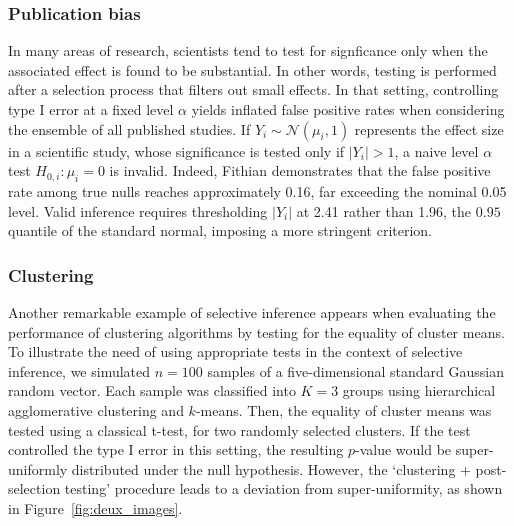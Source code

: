 \documentclass[a4paper,11pt]{article}
\theoremstyle{plain}
\newcommand{\1}{\mathbf{1}}
\begin{document}


\subsubsection{Publication bias}


In many areas of research, scientists tend to test for signficance only when the associated effect is found to be substantial. In other words, testing is performed after a selection process that filters out small effects. In that setting, controlling type I error at a fixed level $\alpha$ yields inflated false positive rates when considering the ensemble of all published studies. 
If $Y_i \sim \mathcal{N}(\mu_i,1)$ represents the effect size in a scientific study, whose significance is tested only if  $|Y_i| > 1$, a naive level $\alpha$ test $H_{0,i}: \mu_i = 0$ is invalid. Indeed, Fithian \cite{fithian} demonstrates that the false positive rate among true nulls reaches approximately 0.16, far exceeding the nominal 0.05 level. Valid inference requires thresholding $|Y_i|$ at 2.41 rather than 1.96, the $0.95$ quantile of the standard normal, imposing a more stringent criterion.


\subsubsection{Clustering}\label{sec:clustering}

Another remarkable example of selective inference appears when evaluating the performance of clustering algorithms by testing for the equality of cluster means.
To illustrate the need of using appropriate tests in the context of selective inference, we simulated $n = 100$ samples of a five-dimensional standard Gaussian random vector. Each sample was classified into $K = 3$ groups using hierarchical agglomerative clustering and $k$-means. Then, the equality of cluster means was tested using a classical t-test, for two randomly selected clusters. If the test controlled the type I error in this setting, the resulting $p$-value would be super-uniformly distributed under the null hypothesis. However, the `clustering + post-selection testing' procedure leads to a deviation from super-uniformity, as shown in Figure~\ref{fig:deux_images}.
\end{document}
